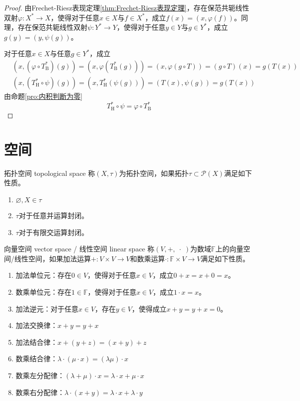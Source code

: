 \documentclass[lang = cn, scheme = chinese, thmcnt = section]{elegantbook}
\newcommand{\sub}{\subset}             %
\begin{document}
\begin{proof}
	由Frechet-Riesz表现定理\ref{thm:Frechet-Riesz表现定理}，存在保范共轭线性双射$\varphi:X^*\to X$，使得对于任意$x\in X$与$f\in X^*$，成立$f(x)=(x,\varphi(f))$。同理，存在保范共轭线性双射$\psi:Y^*\to Y$，使得对于任意$y\in Y$与$g\in Y^*$，成立$g(y)=(y,\psi(g))$。
	
	对于任意$x\in X$与任意$g\in Y^*$，成立
	\begin{align*}
		& (x,(\varphi\circ T_{\text{B}}^*)(g))
		= (x,\varphi(T_{\text{B}}^*(g)))
		= (x,\varphi(g\circ T))
		= (g\circ T)(x)
		= g(T(x))\\
		& (x,(T_{\text{H}}^*\circ \psi)(g))
		= (x,T_{\text{H}}^*(\psi(g)))
		= (T(x),\psi(g))
		= g(T(x))
	\end{align*}
	由命题\ref{pro:内积判断为零}
	$$
	T_{\text{H}}^*\circ \psi=\varphi\circ T_{\text{B}}^*
	$$
\end{proof}

\appendix

\chapter{空间}

\begin{definition}{拓扑空间 topological space}
	称$(X,\tau)$为拓扑空间，如果拓扑$\tau\sub\mathscr{P}(X)$满足如下性质。
	\begin{enumerate}
		\item $\varnothing,X\in \tau$
		\item $\tau$对于任意并运算封闭。
		\item $\tau$对于有限交运算封闭。
	\end{enumerate}
\end{definition}

\begin{definition}{向量空间 vector space / 线性空间 linear space}
	称$(V,+,\;\cdot\;)$为数域$\mathbb{F}$上的向量空间/线性空间，如果加法运算$+:V\times V\to V$和数乘运算$\cdot:\mathbb{F}\times V\to V$满足如下性质。
	\begin{enumerate}
		\item 加法单位元：存在$0\in V$，使得对于任意$x\in V$，成立$0+x=x+0=x$。
		\item 数乘单位元：存在$1\in \mathbb{F}$，使得对于任意$x\in V$，成立$1\cdot x=x$。
		\item 加法逆元：对于任意$x\in V$，存在$y\in V$，使得成立$x+y=y+x=0$。
		\item 加法交换律：$x+y=y+x$
		\item  加法结合律：$x+(y+z)=(x+y)+z$
		\item 数乘结合律：$\lambda\cdot (\mu\cdot x)=(\lambda\mu)\cdot x$
		\item  数乘左分配律：$(\lambda+\mu)\cdot x=\lambda \cdot x+\mu \cdot x$
		\item 数乘右分配律：$\lambda\cdot(x+y)=\lambda \cdot x+\lambda \cdot y$
	\end{enumerate}
\end{definition}
\end{document}

